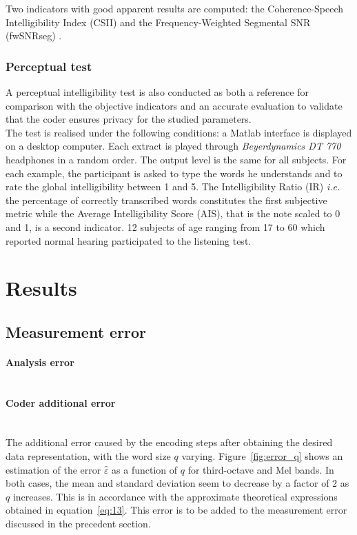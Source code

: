 \documentclass[12pt,times,onecolumn]{article}
\begin{document}
Two indicators with good apparent results are computed: the Coherence-Speech Intelligibility Index (CSII) \cite{kates2005} and the Frequency-Weighted Segmental SNR (fwSNRseg) \cite{hu2008}.


\subsubsection{Perceptual test}
A perceptual intelligibility test is also conducted as both a reference for comparison with the objective indicators and an accurate evaluation to validate that the coder ensures privacy for the studied parameters.\\

The test is realised under the following conditions: a Matlab interface is displayed on a desktop computer. Each extract is played through \textit{Beyerdynamics DT 770} headphones in a random order. The output level is the same for all subjects. For each example, the participant is asked to type the words he understands and to rate the global intelligibility between 1 and 5. The Intelligibility Ratio (IR) \textit{i.e.} the percentage of correctly transcribed words constitutes the first subjective metric while the Average Intelligibility Score (AIS), that is the note scaled to 0 and 1, is a second indicator. 12 subjects of age ranging from 17 to 60 which reported normal hearing participated to the listening test.


\section{Results}
\subsection{Measurement error}
\paragraph{Analysis error\\\\}

\paragraph{Coder additional error\\\\}
The additional error caused by the encoding steps after obtaining the desired data representation, with the word size $q$ varying. Figure~\ref{fig:error_q} shows an estimation of the error $\hat{\varepsilon}$ as a function of $q$ for third-octave and Mel bands. In both cases, the mean and standard deviation seem to decrease by a factor of 2 as $q$ increases. This is in accordance with the approximate theoretical expressions obtained in equation~\ref{eq:13}. This error is to be added to the measurement error discussed in the precedent section.
\end{document}

